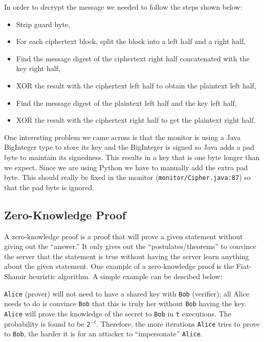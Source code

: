\documentclass[10pt]{article}
\begin{document}
In order to decrypt the message we needed to follow the steps shown below:
\begin{itemize}
    \item Strip guard byte,
    \item For each ciphertext block, split the block into a left half and a
          right half,
    \item Find the message digest of the ciphertext right half concatenated
          with the key right half,
    \item XOR the result with the ciphertext left half to obtain the plaintext
          left half,
    \item Find the message digest of the plaintext left half and the key left
          half,
    \item XOR the result with the ciphertext right half to get the plaintext
          right half.
\end{itemize}

One interesting problem we came across is that the monitor is using a Java
BigInteger type to store its key and the BigInteger is signed so Java adds a
pad byte to maintain its signedness. This results in a key that is one byte
longer than we expect. Since we are using Python we have to manually add the
extra pad byte. This should really be fixed in the monitor
(\texttt{monitor/Cipher.java:87}) so that the pad byte is ignored.

\newpage
\subsection{Zero-Knowledge Proof}
A zero-knowledge proof is a proof that will prove a given statement
without giving out the ``answer.'' It only gives out the
``postulates/theorems'' to convince the server that the statement is true
without having the server learn anything about the given statement. One example
of a zero-knowledge proof is the Fiat-Shamir heuristic algorithm. A simple example
can be descibed below:

\texttt{Alice} (prover) will not need to have a shared key with \texttt{Bob}
(verifier); all Alice needs to do is convince \texttt{Bob} that this is truly
her without \texttt{Bob} having the key. \texttt{Alice} will prove the
knowledge of the secret to \texttt{Bob} in \texttt{t} executions. The
probability is found to be \texttt{2$^{-t}$}. Therefore, the more iterations
\texttt{Alice} tries to prove to \texttt{Bob}, the harder it is for an attacker
to ``impersonate'' \texttt{Alice}.
\end{document}
